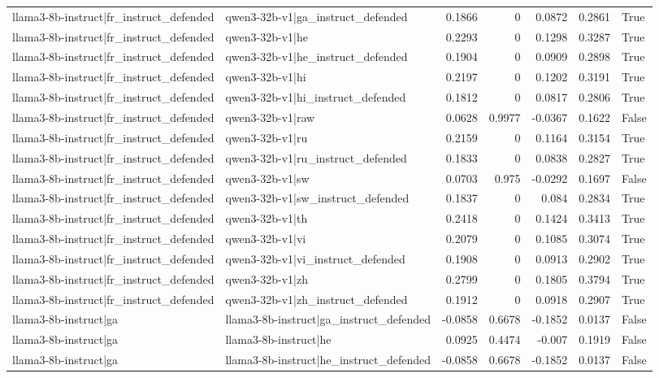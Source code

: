 \begin{table}
\begin{tabular}{l l r r r r l}
llama3-8b-instruct|fr_instruct_defended & qwen3-32b-v1|ga_instruct_defended & 0.1866 & 0 & 0.0872 & 0.2861 & True \\
llama3-8b-instruct|fr_instruct_defended & qwen3-32b-v1|he & 0.2293 & 0 & 0.1298 & 0.3287 & True \\
llama3-8b-instruct|fr_instruct_defended & qwen3-32b-v1|he_instruct_defended & 0.1904 & 0 & 0.0909 & 0.2898 & True \\
llama3-8b-instruct|fr_instruct_defended & qwen3-32b-v1|hi & 0.2197 & 0 & 0.1202 & 0.3191 & True \\
llama3-8b-instruct|fr_instruct_defended & qwen3-32b-v1|hi_instruct_defended & 0.1812 & 0 & 0.0817 & 0.2806 & True \\
llama3-8b-instruct|fr_instruct_defended & qwen3-32b-v1|raw & 0.0628 & 0.9977 & -0.0367 & 0.1622 & False \\
llama3-8b-instruct|fr_instruct_defended & qwen3-32b-v1|ru & 0.2159 & 0 & 0.1164 & 0.3154 & True \\
llama3-8b-instruct|fr_instruct_defended & qwen3-32b-v1|ru_instruct_defended & 0.1833 & 0 & 0.0838 & 0.2827 & True \\
llama3-8b-instruct|fr_instruct_defended & qwen3-32b-v1|sw & 0.0703 & 0.975 & -0.0292 & 0.1697 & False \\
llama3-8b-instruct|fr_instruct_defended & qwen3-32b-v1|sw_instruct_defended & 0.1837 & 0 & 0.084 & 0.2834 & True \\
llama3-8b-instruct|fr_instruct_defended & qwen3-32b-v1|th & 0.2418 & 0 & 0.1424 & 0.3413 & True \\
llama3-8b-instruct|fr_instruct_defended & qwen3-32b-v1|vi & 0.2079 & 0 & 0.1085 & 0.3074 & True \\
llama3-8b-instruct|fr_instruct_defended & qwen3-32b-v1|vi_instruct_defended & 0.1908 & 0 & 0.0913 & 0.2902 & True \\
llama3-8b-instruct|fr_instruct_defended & qwen3-32b-v1|zh & 0.2799 & 0 & 0.1805 & 0.3794 & True \\
llama3-8b-instruct|fr_instruct_defended & qwen3-32b-v1|zh_instruct_defended & 0.1912 & 0 & 0.0918 & 0.2907 & True \\
llama3-8b-instruct|ga & llama3-8b-instruct|ga_instruct_defended & -0.0858 & 0.6678 & -0.1852 & 0.0137 & False \\
llama3-8b-instruct|ga & llama3-8b-instruct|he & 0.0925 & 0.4474 & -0.007 & 0.1919 & False \\
llama3-8b-instruct|ga & llama3-8b-instruct|he_instruct_defended & -0.0858 & 0.6678 & -0.1852 & 0.0137 & False \\

\end{tabular}
\end{table}
